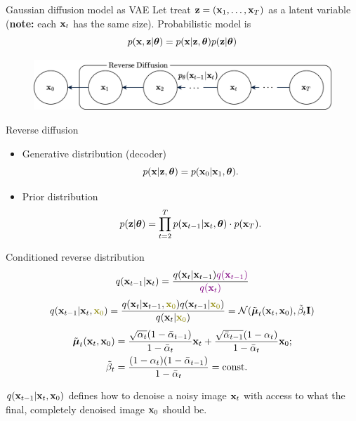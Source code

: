 \begin{frame}{Gaussian diffusion model as VAE}
	Let treat $\mathbf{z} = (\mathbf{x}_1, \dots, \mathbf{x}_T)$ as a latent variable (\textbf{note:} each $\mathbf{x}_t$ has the same size). Probabilistic model is
		\[
			p(\mathbf{x}, \mathbf{z} | \boldsymbol{\theta}) = p(\mathbf{x} | \mathbf{z}, \boldsymbol{\theta}) p(\mathbf{z} | \boldsymbol{\theta})
		\]	
		\vspace{-0.4cm}
	\begin{figure}
		\includegraphics[width=0.8\linewidth]{figs/diffusion_pgm_reverse}
	\end{figure}
	\begin{block}{Reverse diffusion}

	\begin{itemize}
		\item Generative distribution (decoder)
		\vspace{-0.3cm}
		\[
			p(\mathbf{x} | \mathbf{z}, \boldsymbol{\theta}) = p(\mathbf{x}_0 | \mathbf{x}_1, \boldsymbol{\theta}).
		\]
		\item Prior distribution
		\vspace{-0.3cm}
		\[
			p(\mathbf{z} | \boldsymbol{\theta}) = \prod_{t=2}^T p(\mathbf{x}_{t - 1} | \mathbf{x}_t, \boldsymbol{\theta})  \cdot p(\mathbf{x}_T).
		\]
	\end{itemize}
	\end{block}
\end{frame}
\begin{frame}{Conditioned reverse distribution}
	\[
		q(\mathbf{x}_{t-1}|\mathbf{x}_{t}) = \frac{q(\mathbf{x}_{t}|\mathbf{x}_{t-1}) {\color{violet}q(\mathbf{x}_{t-1})}}{{\color{violet}q(\mathbf{x}_{t})}} 
	\]
	\[
		q(\bx_{t-1}|\bx_{t}, {\color{olive}\bx_0}) = \frac{q(\bx_{t}|\bx_{t-1}, {\color{olive}\bx_0}) q(\bx_{t-1} | {\color{olive}\bx_0}) }{q(\bx_{t}| {\color{olive}\bx_0})} = \cN(\tilde{\bmu}_t(\bx_t, \bx_0), \tilde{\beta}_t \bI)
	\]
	\begin{align*}
		\tilde{\boldsymbol{\mu}}_t(\mathbf{x}_t, \mathbf{x}_0) &= \frac{\sqrt{\alpha_t}(1 - \bar{\alpha}_{t-1})}{1 - \bar{\alpha}_t} \mathbf{x}_t + \frac{\sqrt{\bar{\alpha}_{t-1}}(1 - \alpha_t)}{1 - \bar{\alpha}_t} \mathbf{x}_0; \\
		\tilde{\beta}_t &= \frac{(1 - \alpha_t)(1 - \bar{\alpha}_{t-1})}{1 - \bar{\alpha}_t} = \text{const}.
	\end{align*}
	
	$q(\mathbf{x}_{t-1} | \mathbf{x}_t, \mathbf{x}_0)$ defines how to denoise a noisy image $\mathbf{x}_t$ with access to what the final, completely denoised image $\mathbf{x}_0$ should be.
\end{frame}
